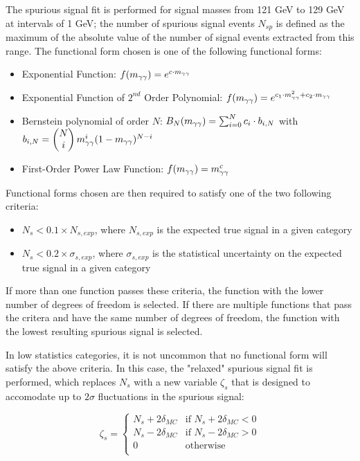 The spurious signal fit is performed for signal masses from 121 GeV to 129 GeV at intervals of 1 GeV; the number of spurious signal events $N_{sp}$ is defined as the maximum of the absolute value of the number of signal events extracted from this range. The functional form chosen is one of the following functional forms:

\begin{itemize}
\item Exponential Function: $f(m_{\gamma\gamma}) = e^{c\cdot m_{\gamma\gamma}}$
\item Exponential Function of $2^{nd}$ Order Polynomial: $f(m_{\gamma\gamma}) = e^{c_1\cdot m^2_{\gamma\gamma}+c_2\cdot m_{\gamma\gamma}}$
\item Bernstein polynomial of order $N$: $B_{N}(m_{\gamma\gamma}) = \sum_{i=0}^N c_i\cdot b_{i,N}$ with ${b_{i,N} = \begin{pmatrix}N\\i\end{pmatrix}m_{\gamma\gamma}^i (1-m_{\gamma\gamma})^{N-i}}$
\item First-Order Power Law Function: $f(m_{\gamma\gamma}) = m_{\gamma\gamma}^c$
\end{itemize}

Functional forms chosen are then required to satisfy one of the two following criteria:

\begin{itemize}
\item $N_{s} < 0.1 \times N_{s,exp}$, where $N_{s,exp}$ is the expected true signal in a given category
\item $N_{s} < 0.2 \times \sigma_{s,exp}$, where $\sigma_{s,exp}$ is the statistical uncertainty on the expected true signal in a given category
\end{itemize}

If more than one function passes these criteria, the function with the lower number of degrees of freedom is selected. If there are multiple functions that pass the critera and have the same number of degrees of freedom, the function with the lowest resulting spurious signal is selected.

In low statistics categories, it is not uncommon that no functional form will satisfy the above criteria. In this case, the "relaxed" spurious signal fit is performed, which replaces $N_{s}$ with a new variable $\zeta_{s}$ that is designed to accomodate up to $2\sigma$ fluctuations in the spurious signal:

\[\zeta_{s} = \begin{cases} 
      N_{s} + 2 \delta_{MC} & \mbox{if }  N_{s} + 2 \delta_{MC} < 0\\
      N_{s} - 2 \delta_{MC} & \mbox{if }  N_{s} - 2 \delta_{MC} > 0\\
      0 & \mbox{otherwise } \\
   \end{cases}
\]

